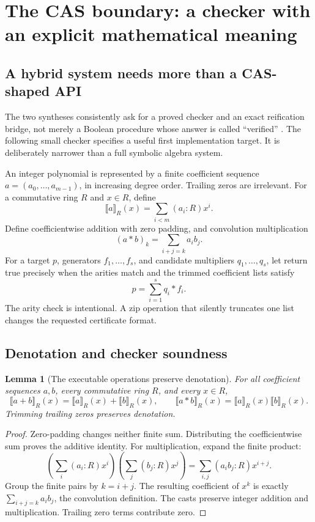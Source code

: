 \documentclass[11pt,letterpaper]{article}
\newcommand{\code}[1]{\texttt{\detokenize{#1}}}
\newcommand{\sem}[1]{\llbracket #1\rrbracket}
\newtheorem{lemma}[theorem]{Lemma}
\theoremstyle{definition}
\theoremstyle{remark}
\begin{document}
\section{The CAS boundary: a checker with an explicit mathematical meaning}\label{sec:cas}

\subsection{A hybrid system needs more than a CAS-shaped API}
The two syntheses consistently ask for a proved checker and an exact reification
bridge, not merely a Boolean procedure whose answer is called ``verified''
\cite{syn-a,syn-b}. The following small checker specifies a useful first
implementation target. It is deliberately narrower than a full symbolic
algebra system.

An integer polynomial is represented by a finite coefficient sequence
$a=(a_0,\ldots,a_{m-1})$, in increasing degree order. Trailing zeros are
irrelevant. For a commutative ring $R$ and $x\in R$, define
\[
                    \sem a_R(x)=\sum_{i<m}(a_i:R)x^i.
\]
Define coefficientwise addition with zero padding, and convolution multiplication
\[
                (a*b)_k=\sum_{i+j=k}a_i b_j.
\]
For a target $p$, generators $f_1,\ldots,f_s$, and candidate multipliers
$q_1,\ldots,q_s$, let \code{checkCombination} return true precisely when the
arities match and the trimmed coefficient lists satisfy
\begin{equation}\label{eq:cert}
                         p=\sum_{i=1}^s q_i*f_i.
\end{equation}
The arity check is intentional. A zip operation that silently truncates one
list changes the requested certificate format.

\subsection{Denotation and checker soundness}
\begin{lemma}[The executable operations preserve denotation]\label{lem:denote}
For all coefficient sequences $a,b$, every commutative ring $R$, and every
$x\in R$,
\[
 \sem{a+b}_R(x)=\sem a_R(x)+\sem b_R(x),\qquad
 \sem{a*b}_R(x)=\sem a_R(x)\sem b_R(x).
\]
Trimming trailing zeros preserves denotation.
\end{lemma}
\begin{proof}
Zero-padding changes neither finite sum. Distributing the coefficientwise sum
proves the additive identity. For multiplication, expand the finite product:
\[
 \left(\sum_i(a_i:R)x^i\right)
 \left(\sum_j(b_j:R)x^j\right)
 =\sum_{i,j}(a_ib_j:R)x^{i+j}.
\]
Group the finite pairs by $k=i+j$. The resulting coefficient of $x^k$ is exactly
$\sum_{i+j=k}a_ib_j$, the convolution definition. The casts preserve integer
addition and multiplication. Trailing zero terms contribute zero.
\end{proof}
\end{document}
